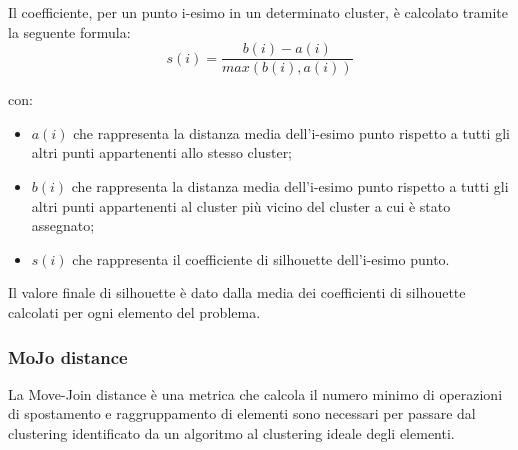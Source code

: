             Il coefficiente, per un punto i-esimo in un determinato cluster, è calcolato tramite la seguente formula:
            \begin{equation*}
                s(i) = \frac{b(i) - a(i)}{max(b(i),a(i))}    
            \end{equation*}
            
            con:
            \begin{itemize}
                \item $a(i)$ che rappresenta la distanza media dell'i-esimo punto rispetto a tutti gli altri punti appartenenti allo stesso cluster;
                
                \item $b(i)$ che rappresenta la distanza media dell’i-esimo punto rispetto a tutti gli altri punti appartenenti al cluster più vicino del cluster a cui è stato assegnato;
                
                \item $s(i)$ che rappresenta il coefficiente di silhouette dell’i-esimo punto.
            \end{itemize}
            
            Il valore finale di silhouette è dato dalla media dei coefficienti di silhouette calcolati per ogni elemento del problema.
            
        \subsubsection{MoJo distance}
            La Move-Join distance è una metrica che calcola il numero minimo di operazioni di spostamento e raggruppamento di elementi sono necessari per passare dal clustering identificato da un algoritmo al clustering ideale degli elementi.
